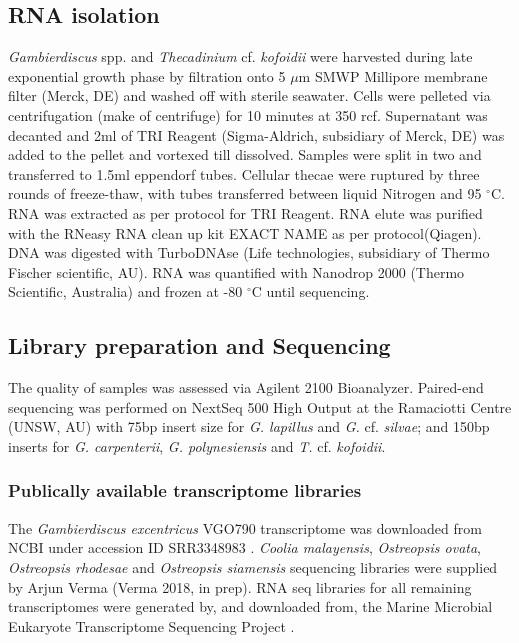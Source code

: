\documentclass[12pt]{article}
\begin{document}
\subsection*{RNA isolation}
\emph{Gambierdiscus} spp. and \emph{Thecadinium} cf. \emph{kofoidii} were harvested during late exponential growth phase by filtration onto 5 $\mu$m SMWP Millipore membrane filter (Merck, DE) and washed off with sterile seawater. 
Cells were pelleted via centrifugation (make of centrifuge) for 10 minutes at 350 rcf. 
Supernatant was decanted and 2ml of TRI Reagent (Sigma-Aldrich, subsidiary of Merck, DE) was added to the pellet and vortexed till dissolved. 
Samples were split in two and transferred to 1.5ml eppendorf tubes. 
Cellular thecae were ruptured by three rounds of freeze-thaw, with tubes transferred between liquid Nitrogen and 95 $^{\circ}$C. 
RNA was extracted as per protocol for TRI Reagent. 
RNA elute was purified with the RNeasy RNA clean up kit EXACT NAME as per protocol(Qiagen). 
DNA was digested with TurboDNAse (Life technologies, subsidiary of Thermo Fischer scientific, AU). 
RNA was quantified with Nanodrop 2000 (Thermo Scientific, Australia) and frozen at -80 $^{\circ}$C until sequencing.
 
\subsection*{Library preparation and Sequencing}
The quality of samples was assessed via Agilent 2100 Bioanalyzer. 
Paired-end sequencing was performed on NextSeq 500 High Output at the Ramaciotti Centre (UNSW, AU) with 75bp insert size for \emph{G. lapillus} and \emph{G.} cf. \emph{silvae}; and 150bp inserts for \emph{G. carpenterii}, \emph{G. polynesiensis} and \emph{T.} cf. \emph{kofoidii}.

\subsubsection*{Publically available transcriptome libraries}
The \emph{Gambierdiscus excentricus} VGO790 transcriptome was downloaded from NCBI under accession ID SRR3348983 \cite{kohli2017role}. 
\textit{Coolia malayensis}, \textit{Ostreopsis ovata}, \textit{Ostreopsis rhodesae} and \textit{Ostreopsis siamensis} sequencing libraries were supplied by Arjun Verma (Verma 2018, in prep). 
RNA seq libraries for all remaining transcriptomes were generated by, and downloaded from, the Marine Microbial Eukaryote Transcriptome Sequencing Project \citep{keeling2014marine}.
\end{document}
